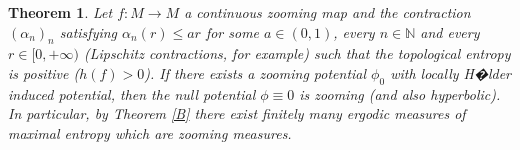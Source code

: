 \documentclass[12pt,a4paper]{amsart}
\theoremstyle{plain}
\newtheorem{theorem}{Theorem}[subsection]
\newtheorem{remark}{Remark}[subsection]
\begin{document}
%

\begin{theorem}\label{ZER}
	Let $f:M \to M$ a continuous zooming map and  the contraction $(\alpha_{n})_{n}$ satisfying $\alpha_{n}(r) \leq ar$ for some $a \in (0,1)$, every $n \in \mathbb{N}$ and every $r \in [0,+\infty)$ (Lipschitz contractions, for example) such that the topological entropy is positive ($h(f) > 0$). If there exists a zooming potential $\phi_{0}$ with locally H�lder induced potential, then the null potential $\phi \equiv 0$ is  zooming (and also hyperbolic). In particular, by Theorem \ref{B} there exist finitely many ergodic measures of maximal entropy which are zooming measures.
\end{theorem}
%	
\end{document}
